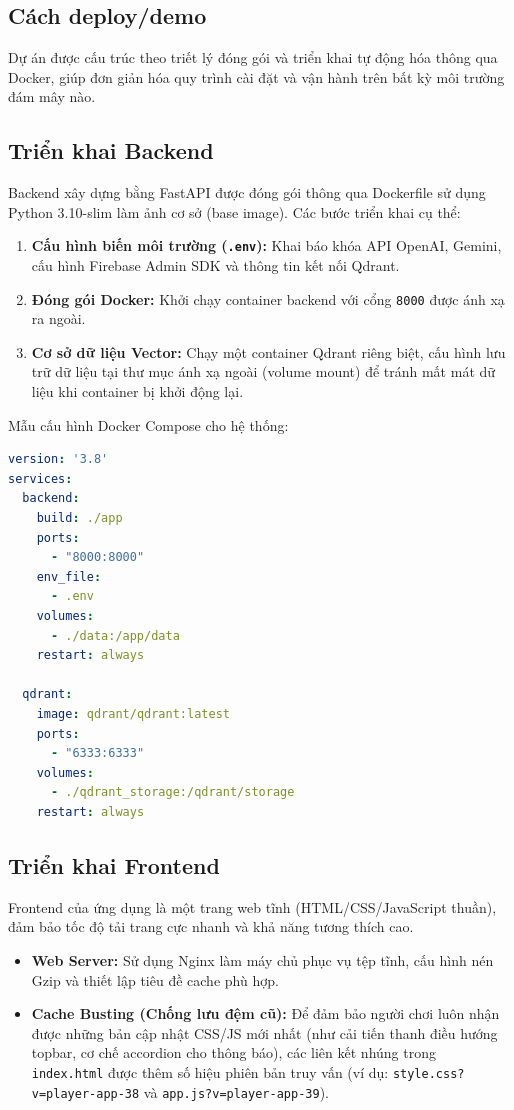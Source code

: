 \documentclass[a4paper]{article}
\begin{document}
\begin{titlepage}
\section{Cách deploy/demo}

Dự án được cấu trúc theo triết lý đóng gói và triển khai tự động hóa thông qua Docker, giúp đơn giản hóa quy trình cài đặt và vận hành trên bất kỳ môi trường đám mây nào.

\subsection{Triển khai Backend}
Backend xây dựng bằng FastAPI được đóng gói thông qua Dockerfile sử dụng Python 3.10-slim làm ảnh cơ sở (base image). Các bước triển khai cụ thể:
\begin{enumerate}
    \item \textbf{Cấu hình biến môi trường (\texttt{.env}):} Khai báo khóa API OpenAI, Gemini, cấu hình Firebase Admin SDK và thông tin kết nối Qdrant.
    \item \textbf{Đóng gói Docker:} Khởi chạy container backend với cổng \texttt{8000} được ánh xạ ra ngoài.
    \item \textbf{Cơ sở dữ liệu Vector:} Chạy một container Qdrant riêng biệt, cấu hình lưu trữ dữ liệu tại thư mục ánh xạ ngoài (volume mount) để tránh mất mát dữ liệu khi container bị khởi động lại.
\end{enumerate}

Mẫu cấu hình Docker Compose cho hệ thống:
\begin{lstlisting}[language=yaml, caption=Cấu hình docker-compose.yml mẫu]
version: '3.8'
services:
  backend:
    build: ./app
    ports:
      - "8000:8000"
    env_file:
      - .env
    volumes:
      - ./data:/app/data
    restart: always

  qdrant:
    image: qdrant/qdrant:latest
    ports:
      - "6333:6333"
    volumes:
      - ./qdrant_storage:/qdrant/storage
    restart: always
\end{lstlisting}

\subsection{Triển khai Frontend}
Frontend của ứng dụng là một trang web tĩnh (HTML/CSS/JavaScript thuần), đảm bảo tốc độ tải trang cực nhanh và khả năng tương thích cao.
\begin{itemize}
    \item \textbf{Web Server:} Sử dụng Nginx làm máy chủ phục vụ tệp tĩnh, cấu hình nén Gzip và thiết lập tiêu đề cache phù hợp.
    \item \textbf{Cache Busting (Chống lưu đệm cũ):} Để đảm bảo người chơi luôn nhận được những bản cập nhật CSS/JS mới nhất (như cải tiến thanh điều hướng topbar, cơ chế accordion cho thông báo), các liên kết nhúng trong \texttt{index.html} được thêm số hiệu phiên bản truy vấn (ví dụ: \texttt{style.css?v=player-app-38} và \texttt{app.js?v=player-app-39}).
\end{itemize}


\end{titlepage}
\end{document}
